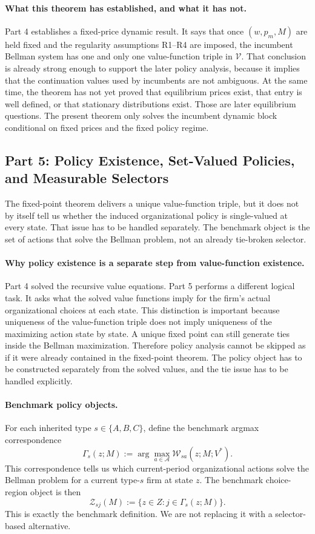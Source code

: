 \paragraph{What this theorem has established, and what it has not.}
Part 4 establishes a fixed-price dynamic result. It says that once $(w,p_m,M)$ are held fixed and the regularity assumptions R1--R4 are imposed, the incumbent Bellman system has one and only one value-function triple in $\mathcal V$. That conclusion is already strong enough to support the later policy analysis, because it implies that the continuation values used by incumbents are not ambiguous. At the same time, the theorem has not yet proved that equilibrium prices exist, that entry is well defined, or that stationary distributions exist. Those are later equilibrium questions. The present theorem only solves the incumbent dynamic block conditional on fixed prices and the fixed policy regime.

\subsection{Part 5: Policy Existence, Set-Valued Policies, and Measurable Selectors}

The fixed-point theorem delivers a unique value-function triple, but it does not by itself tell us whether the induced organizational policy is single-valued at every state. That issue has to be handled separately. The benchmark object is the set of actions that solve the Bellman problem, not an already tie-broken selector.

\paragraph{Why policy existence is a separate step from value-function existence.}
Part 4 solved the recursive value equations. Part 5 performs a different logical task. It asks what the solved value functions imply for the firm's actual organizational choices at each state. This distinction is important because uniqueness of the value-function triple does not imply uniqueness of the maximizing action state by state. A unique fixed point can still generate ties inside the Bellman maximization. Therefore policy analysis cannot be skipped as if it were already contained in the fixed-point theorem. The policy object has to be constructed separately from the solved values, and the tie issue has to be handled explicitly.

\paragraph{Benchmark policy objects.}
For each inherited type $s\in\{A,B,C\}$, define the benchmark argmax correspondence
\[
\Gamma_s(z;M):=\arg\max_{a\in\mathcal A}\mathcal W_{sa}(z;M;V^*).
\]
This correspondence tells us which current-period organizational actions solve the Bellman problem for a current type-$s$ firm at state $z$. The benchmark choice-region object is then
\[
\mathcal Z_{sj}(M):=\{z\in Z:j\in\Gamma_s(z;M)\}.
\]
This is exactly the benchmark definition. We are not replacing it with a selector-based alternative.

